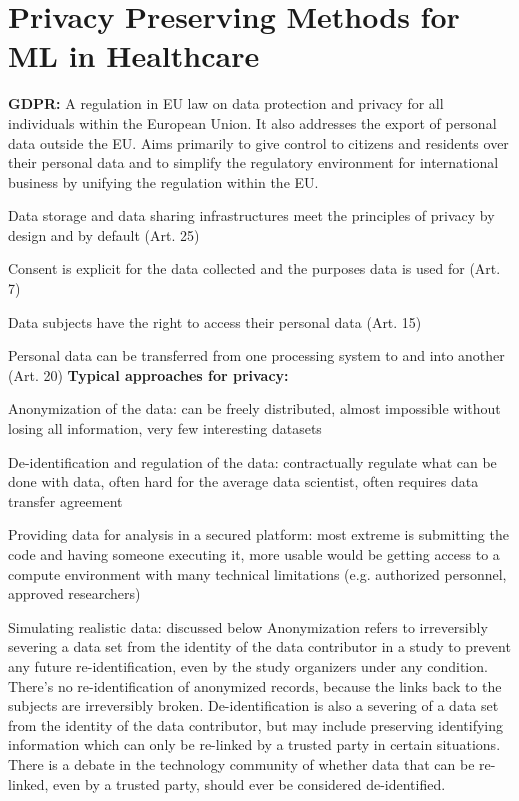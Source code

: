 \documentclass[12pt]{article}
\begin{document}
\section{Privacy Preserving Methods for ML in Healthcare}
\textbf{GDPR:} A regulation in EU law on data protection and privacy for all individuals within the European Union. It also addresses the export of personal data outside the EU. Aims primarily to give control to citizens and residents over their personal data and to simplify the regulatory environment for international business by unifying the regulation within the EU.
\ulb
\item Data storage and data sharing infrastructures meet the principles of privacy by design and by default (Art. 25)
\item Consent is explicit for the data collected and the purposes data is used for (Art. 7)
\item Data subjects have the right to access their personal data (Art. 15)
\item Personal data can be transferred from one processing system to and into another (Art. 20)
\ule
\textbf{Typical approaches for privacy:}
\ulb
\item Anonymization of the data: can be freely distributed, almost impossible without losing all information, very few interesting datasets
\item De-identification and regulation of the data: contractually regulate what can be done with data, often hard for the average data scientist, often requires data transfer agreement
\item Providing data for analysis in a secured platform: most extreme is submitting the code and having someone executing it, more usable would be getting access to a compute environment with many technical limitations (e.g. authorized personnel, approved researchers)
\item Simulating realistic data: discussed below
\ule
Anonymization refers to irreversibly severing a data set from the identity of the data contributor in a study to prevent any future re-identification, even by the study organizers under any condition. There's no re-identification of anonymized records, because the links back to the subjects are irreversibly broken. De-identification is also a severing of a data set from the identity of the data contributor, but may include preserving identifying information which can only be re-linked by a trusted party in certain situations. There is a debate in the technology community of whether data that can be re-linked, even by a trusted party, should ever be considered de-identified.
\end{document}

